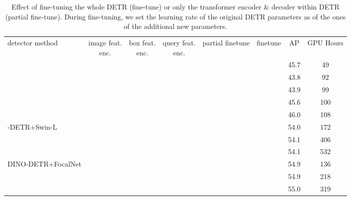\documentclass[10pt,twocolumn,letterpaper]{article}
\newcommand{\cmark}{\ding{51}}\newcommand{\xmark}{\ding{55}}
\begin{document}
\begin{table}[t]
\begin{minipage}[t]{1\linewidth}
\vspace{-3mm}
\centering
\setlength{\tabcolsep}{0.25pt}
\footnotesize
\renewcommand{\arraystretch}{1.2}
\resizebox{1.0\linewidth}{!}
{
\begin{tabular}{l|ccc|cc|c|c}
detector method & \thead{image feat.\\ enc.} & \thead{box feat.\\ enc.} & \thead{query feat. \\ enc.} & partial finetune &  finetune & AP & GPU Hours \\
\shline
\multirow{5}{*}{-DETR+R50} & \cmark & \cmark & \cmark & \xmark & \xmark & 45.7 & 49 \\ 
& \xmark & \xmark & \xmark & \cmark & \xmark &  43.8 & 92 \\
&\xmark & \xmark & \xmark & \xmark & \cmark & 43.9 & 99 \\
&\cmark & \cmark & \cmark & \cmark & \xmark & 45.6 & 100 \\
&\cmark & \cmark & \cmark & \xmark & \cmark & 46.0 & 108\\
\hline
\multirow{3}{*}{-DETR+Swin-L}  & \cmark & \cmark & \cmark & \xmark & \xmark & 54.0 & 172\\
& \cmark & \cmark & \cmark & \cmark & \xmark & 54.1 & 406\\
& \cmark & \cmark & \cmark & \xmark & \cmark & 54.1 & 532\\\hline
\multirow{3}{*}{DINO-DETR+FocalNet}  & \cmark & \cmark & \cmark & \xmark & \xmark & 54.9 & 136\\
& \cmark & \cmark & \cmark & \cmark & \xmark & 54.9 & 218 \\
& \cmark & \cmark & \cmark & \xmark & \cmark & 55.0 & 319\\
\end{tabular}
}
\caption{\footnotesize{
Effect of fine-tuning the whole DETR (fine-tune) or only the transformer encoder \& decoder within DETR (partial fine-tune). During fine-tuning, we set the learning rate of the original DETR parameters as  of the ones of the additional new parameters.}}
\label{tab:finetune_detr}
\end{minipage}
\end{table}
\end{document}
